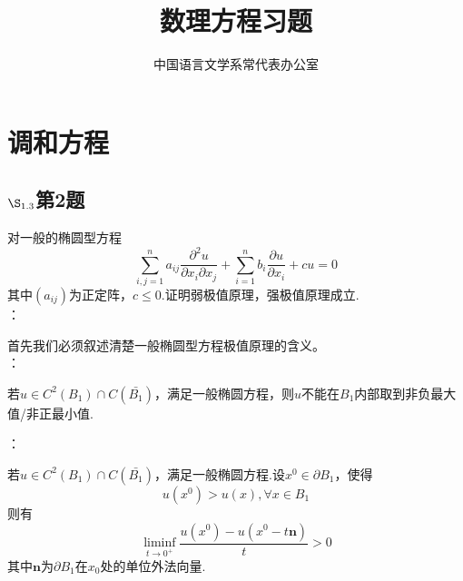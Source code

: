 \documentclass[12pt, a4paper]{article}
\title{数理方程习题}
\author{中国语言文学系常代表办公室}
\begin{document}
	\maketitle
	\iffalse
	\begin{align}
	\\
	&=
	
	\end{align}
	
	$$A_1=
	\begin{pmatrix}
	&   &   &   &  \\
	&   &   &   &  \\
	\end{pmatrix}
	$$
	
	\begin{flushleft}
		\\
	\end{flushleft}
	
	$$x_{k+1} =
	\begin{cases}
	x_k+s_k & \text{if } \rho_k>\eta_1\\
	x_k & \text{otherwise} 
	\end{cases}$$
	
	\uline{下划线}
	\uuline{双下划线}
	\uwave{波浪线}
	\sout{中间删除线}
	\xout{斜删除线}
	\dashuline{虚线}
	\dotuline{加点}
	\fi
	\newpage
	\tableofcontents
	\newpage
	\section{调和方程}
	\subsection{$\S_{1.3}$第2题}
	\kaishu{}
	对一般的椭圆型方程$$
	\sum_{i,j=1}^{n}a_{ij}\frac{\partial^2 u}{\partial x_i \partial x_j}+\sum_{i=1}^{n}b_i \frac{\partial u}{\partial x_i}+cu=0$$
	其中$(a_{ij})$为正定阵，$c\le 0$.证明弱极值原理，强极值原理成立.\\
	
	\songti{}：
	
	首先我们必须叙述清楚一般椭圆型方程极值原理的含义。\\
	
	：
	
	若$u\in C^2(B_1) \cap C(\bar{B_1})$，满足一般椭圆方程，则$u$不能在$B_1$内部取到非负最大值/非正最小值.

	：
	
	若$u\in C^2(B_1) \cap C(\bar{B_1})$，满足一般椭圆方程.设$x^0\in \partial B_1$，使得$$
	u(x^0)>u(x),\forall x \in B_1$$
	则有$$
	\liminf_{t \to 0^+} \frac{u(x^0)-u(x^0-t\bm{n})}{t} >0 $$
	其中$\bm{n}$为$\partial B_1$在$x_0$处的单位外法向量.\\
	
\end{document}
